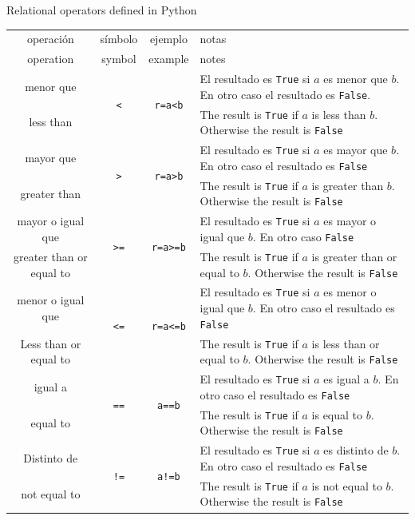 \begin{table}[h]
{Relational operators defined in Python}\label{tabrel}
\centering
\begin{tabular}{cccm{7cm}}
\hline
\hline
operación&símbolo&ejemplo&notas\\
operation&symbol&example&notes\\
\hline
menor que &\multirow{2}{*}{\texttt{<}}&\multirow{2}{*}{\texttt{r=a<b}}&El resultado es \texttt{True} si $a$ es menor que $b$. En otro caso el resultado es \texttt{False}. \\
less than &&& The result is \texttt{True} if $a$ is less than $b$. Otherwise the result is \texttt{False}\\
\hline
mayor que&\multirow{2}{*}{\texttt{>}}&\multirow{2}{*}{\texttt{r=a>b}}& El resultado es \texttt{True} si $a$ es mayor que $b$. En otro caso el resultado es \texttt{False}\\ 
greater than&&& The result is \texttt{True} if $a$ is greater than $b$. Otherwise the result is \texttt{False} \\
\hline
mayor o igual que&\multirow{2}{*}{\texttt{>=}}&\multirow{2}{*}{\texttt{r=a>=b}}&El resultado es \texttt{True} si $a$  es mayor o igual que $b$. En otro caso \texttt{False}\\ 
greater than or equal to&&& The result is \texttt{True} if $a$ is greater than or equal to $b$. Otherwise the result is \texttt{False}\\
\hline
menor o igual que&\multirow{2}{*}{\texttt{<=}}&\multirow{2}{*}{\texttt{r=a<=b}}&El resultado es \texttt{True} si $a$ es menor o igual que $b$. En otro caso el resultado es \texttt{False}\\ 
Less than or equal to&&& The result is \texttt{True} if $a$ is less than or equal to $b$. Otherwise the result is \texttt{False}\\
\hline
igual a&\multirow{2}{*}{\texttt{==}}&\multirow{2}{*}{\texttt{a==b}}&El resultado es \texttt{True} si $a$ es igual a $b$. En otro caso el resultado es \texttt{False}\\ 
equal to &&& The result is \texttt{True} if $a$ is equal to $b$. Otherwise the result is \texttt{False}\\
\hline
Distinto de& \multirow{2}{*}{\texttt{!=}}& \multirow{2}{*}{\texttt{a!=b}}&El resultado es \texttt{True} si $a$ es distinto de $b$. En otro caso el resultado es \texttt{False}\\ 
not equal to&&& The result is \texttt{True} if $a$ is not equal to $b$. Otherwise the result is \texttt{False}\\
\hline
\hline
\end{tabular}
\end{table} 

